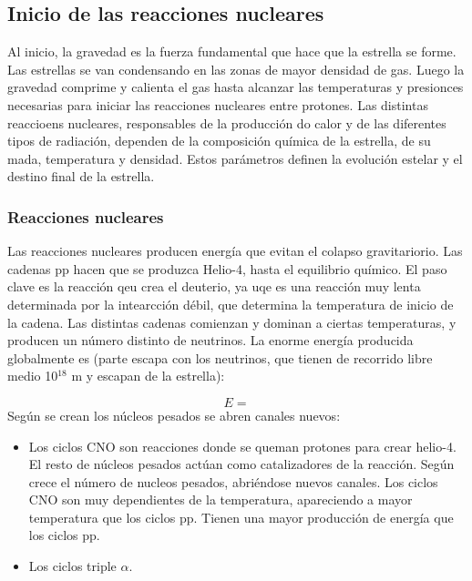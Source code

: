 \subsection{Inicio de las reacciones nucleares}

Al inicio, la gravedad es la fuerza fundamental que hace que la estrella se forme. Las estrellas se van condensando en las zonas de mayor densidad de gas. Luego la gravedad comprime y calienta el gas hasta alcanzar las temperaturas y presionces necesarias para iniciar las reacciones nucleares entre protones. Las distintas reaccioens nucleares, responsables de la producción do calor y de las diferentes tipos de radiación, dependen de la composición química de la estrella, de su mada, temperatura y densidad. Estos parámetros definen la evolución estelar y el destino final de la estrella.

\subsubsection{Reacciones nucleares}

Las reacciones nucleares producen energía que evitan el colapso gravitariorio. Las cadenas pp hacen que se produzca Helio-4, hasta el equilibrio químico. El paso clave es la reacción qeu crea el deuterio, ya uqe es una reacción muy lenta determinada por la intearcción débil, que determina la temperatura de inicio de la cadena. Las distintas cadenas comienzan y dominan a ciertas temperaturas, y producen un número distinto de neutrinos. La enorme energía producida globalmente es (parte escapa con los neutrinos, que tienen de recorrido libre medio 10$^{18}$ m y escapan de la estrella):

\begin{equation}
	E =
\end{equation}
Según se crean los núcleos pesados se abren canales nuevos:

\begin{itemize}
	\item Los ciclos CNO son reacciones donde se queman protones para crear helio-4. El resto de núcleos pesados actúan como catalizadores de la reacción. Según crece el número de nucleos pesados, abriéndose nuevos canales. Los ciclos CNO son muy dependientes de la temperatura, apareciendo a mayor temperatura que los ciclos pp. Tienen una mayor producción de energía que los ciclos pp.
	\item Los ciclos triple $\alpha$.
\end{itemize}

\newpage


